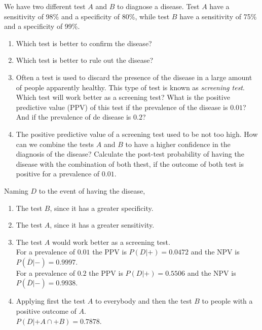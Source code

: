 {We have two different test $A$ and $B$ to diagnose a disease.
Test $A$ have a sensitivity of 98\% and a specificity of 80\%, while test $B$ have a sensitivity of 75\% and a
specificity of 99\%.
\begin{enumerate}
\item Which test is better to confirm the disease?
\item Which test is better to rule out the disease?
\item Often a test is used to discard the presence of the disease in a large amount of people apparently healthy.
This type of test is known as \emph{screening test}.
Which test will work better as a screening test?
What is the positive predictive value (PPV) of this test if the prevalence of the disease is $0.01$? And if the
prevalence of de disease is $0.2$?
\item The positive predictive value of a screening test used to be not too high. 
How can we combine the tests $A$ and $B$ to have a higher confidence in the diagnosis of the disease?
Calculate the post-test probability of having the disease with the combination of both thest, if the outcome of both test is positive for a prevalence of $0.01$.
\end{enumerate}
}
{Naming $D$ to the event of having the disease, 
\begin{enumerate}
\item The test $B$, since it has a greater specificity. 
\item The test $A$, since it has a greater sensitivity. 
\item The test $A$ would work better as a screening test.\\  
For a prevalence of $0.01$ the PPV is $P(D|+)=0.0472$ and the NPV is $P(\overline D|-)=0.9997$.\\
For a prevalence of $0.2$ the PPV is $P(D|+)=0.5506$ and the NPV is $P(\overline D|-)=0.9938$.
\item Applying first the test $A$ to everybody and then the test $B$ to people with a positive outcome of $A$.\\
$P(D|+A\cap +B)=0.7878$. 
\end{enumerate}
}
{}


